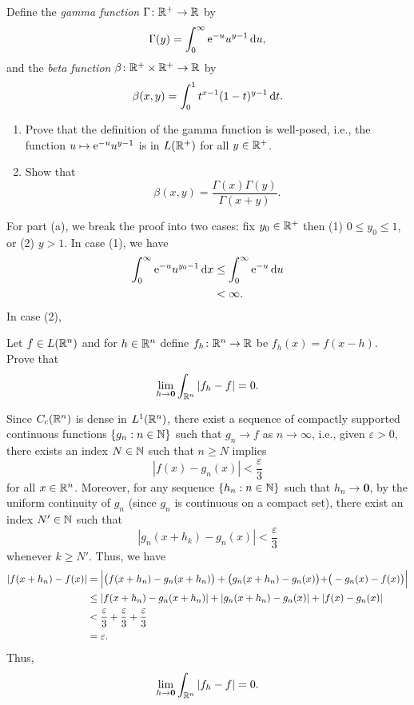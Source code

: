 \begin{problem}
  Define the \emph{gamma function} \(\Gamma\colon\mathbb{R}^+\to\mathbb{R}\) by
  \[
    \Gamma(y)=\int_0^\infty\mathrm{e}^{-u}u^{y-1}\mathop{}\!\mathrm{d} u,
  \]
  and the \emph{beta function} \(\beta\colon\mathbb{R}^+\times\mathbb{R}^+\to\mathbb{R}\) by
  \[
    \beta(x,y)=\int_0^1 t^{x-1}(1-t)^{y-1}\mathop{}\!\mathrm{d} t.
  \]
  \begin{enumerate}[label=(\alph*)]
  \item Prove that the definition of the gamma function is well-posed,
    i.e., the function \(u\mapsto \mathrm{e}^{-u}u^{y-1}\) is in \(L(\mathbb{R}^+)\) for
    all \(y\in\mathbb{R}^+\).
  \item Show that
    \[
      \beta(x,y)=\frac{\Gamma(x)\Gamma(y)}{\Gamma(x+y)}.
    \]
  \end{enumerate}
\end{problem}
\begin{solution}
  For part (a), we break the proof into two cases: fix \(y_0\in\mathbb{R}^+\)
  then (1) \(0\leq y_0\leq 1\), or (2) \(y>1\). In case (1), we have
  \begin{align*}
    \int_0^\infty \mathrm{e}^{-u}u^{y_0-1}\mathop{}\!\mathrm{d} x
    &\leq\int_0^\infty\mathrm{e}^{-u}\mathop{}\!\mathrm{d} u\\
    &<\infty.
  \end{align*}
  In case (2),
\end{solution}

\begin{problem}
  Let \(f\in L(\mathbb{R}^n)\) and for \(h\in\mathbb{R}^n\) define
  \(f_{h}\colon\mathbb{R}^n\to\mathbb{R}\) be \(f_{h}( x )= f( x -h)\). Prove that
  \[
    \lim_{h\to\mathbf{0}}\int_{\mathbb{R}^n}\left|f_{h}-f\right|=0.
  \]
\end{problem}
\begin{solution}
  Since \(C_{\mathrm{c}}(\mathbb{R}^n)\) is dense in \(L^1(\mathbb{R}^n)\), there exist a
  sequence of compactly supported continuous functions \(\{g_n:n\in\mathbb{N}\}\)
  such that \(g_n\to f\) as \(n\to\infty\), i.e., given \(\varepsilon>0\),
  there exists an index \(N\in\mathbb{N}\) such that \(n\geq N\) implies
  \[
    |f(x)-g_n(x)|<\frac{\varepsilon}{3}
  \]
  for all \(x\in\mathbb{R}^n\). Moreover, for any sequence \(\{h_n:n\in\mathbb{N}\}\)
  such that \(h_n\to\mathbf{0}\), by the uniform continuity of \(g_n\)
  (since \(g_n\) is continuous on a compact set), there exist an index
  \(N'\in\mathbb{N}\) such that
  \[
    |g_n(x+h_k)-g_n(x)|<\frac{\varepsilon}{3}
  \]
  whenever \(k\geq N'\). Thus, we have
  \begin{align*}
    |f(x+h_n)-f(x)|
    &=\Bigl|\bigl(f(x+h_n)-g_n(x+h_n)\bigr)
      +\bigl(g_n(x+h_n)-g_n(x)\bigr)
      +\bigr(-g_n(x)-f(x)\bigr)\Bigr|\\
    &\leq|f(x+h_n)-g_n(x+h_n)|
      +|g_n(x+h_n)-g_n(x)|
      +|f(x)-g_n(x)|\\
    &<\frac{\varepsilon}{3}
      +\frac{\varepsilon}{3}
      +\frac{\varepsilon}{3}\\
    &=\varepsilon.
  \end{align*}
  Thus,
  \[
    \lim_{h\to\mathbf{0}}\int_{\mathbb{R}^n}|f_h-f|=0.
  \]
\end{solution}


